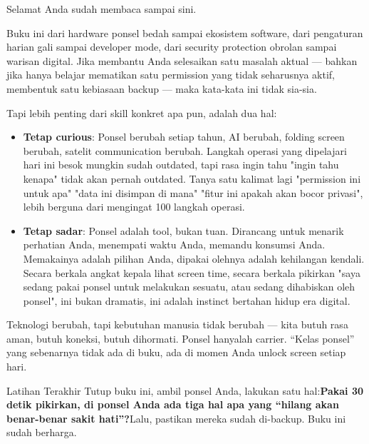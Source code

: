 
Selamat Anda sudah membaca sampai sini.

Buku ini dari hardware ponsel bedah sampai ekosistem software, dari pengaturan harian gali sampai developer mode, dari security protection obrolan sampai warisan digital. Jika membantu Anda selesaikan satu masalah aktual — bahkan jika hanya belajar mematikan satu permission yang tidak seharusnya aktif, membentuk satu kebiasaan backup — maka kata-kata ini tidak sia-sia.

Tapi lebih penting dari skill konkret apa pun, adalah dua hal:

\begin{itemize}
  \item \textbf{Tetap curious}: Ponsel berubah setiap tahun, AI berubah, folding screen berubah, satelit communication berubah. Langkah operasi yang dipelajari hari ini besok mungkin sudah outdated, tapi rasa ingin tahu "ingin tahu kenapa" tidak akan pernah outdated. Tanya satu kalimat lagi "permission ini untuk apa" "data ini disimpan di mana" "fitur ini apakah akan bocor privasi", lebih berguna dari mengingat 100 langkah operasi.
  \item \textbf{Tetap sadar}: Ponsel adalah tool, bukan tuan. Dirancang untuk menarik perhatian Anda, menempati waktu Anda, memandu konsumsi Anda. Memakainya adalah pilihan Anda, dipakai olehnya adalah kehilangan kendali. Secara berkala angkat kepala lihat screen time, secara berkala pikirkan "saya sedang pakai ponsel untuk melakukan sesuatu, atau sedang dihabiskan oleh ponsel", ini bukan dramatis, ini adalah instinct bertahan hidup era digital.
\end{itemize}

Teknologi berubah, tapi kebutuhan manusia tidak berubah — kita butuh rasa aman, butuh koneksi, butuh dihormati. Ponsel hanyalah carrier. “Kelas ponsel” yang sebenarnya tidak ada di buku, ada di momen Anda unlock screen setiap hari.

\begin{tcbpractice}{Latihan Terakhir}
Tutup buku ini, ambil ponsel Anda, lakukan satu hal:\textbf{Pakai 30 detik pikirkan, di ponsel Anda ada tiga hal apa yang “hilang akan benar-benar sakit hati”?}Lalu, pastikan mereka sudah di-backup. Buku ini sudah berharga.

\end{tcbpractice}
